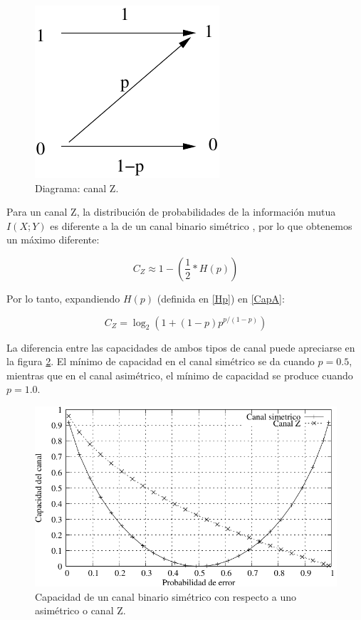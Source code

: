 \begin{figure}[th]
  \begin{center}
    \includegraphics[scale=1]{graphs/zchannel}
  \end{center}
  \caption{Diagrama: canal Z.}
  \label{fig:Gal}
\end{figure}

Para un canal Z, la distribución de probabilidades de la información mutua $I(X;Y)$ es diferente a la de un canal binario simétrico \cite{Tallini:02}, por lo que obtenemos un máximo diferente:

\begin{equation}\label{CapA}
C_{Z} \approx 1 - \left(\frac{1}{2}*H(p)\right)
\end{equation}

Por lo tanto, expandiendo $H(p)$ (definida en \ref{Hp}) en \ref{CapA}:

$$ C_{Z} = \log_2\left(1+(1-p) p^{p/(1-p)}\right) $$

La diferencia entre las capacidades de ambos tipos de canal puede apreciarse en la figura \ref{fig:CompBZ}. El mínimo de capacidad en el canal simétrico se da cuando $p=0.5$, mientras que en el canal asimétrico, el mínimo de capacidad se produce cuando $p=1.0$.

\begin{figure}[th]
  \begin{center}
    \includegraphics[scale=1.1]{graphs/grafico_comparacion_capacidad_binaria_z}
  \end{center}
  \caption{Capacidad de un canal binario simétrico con respecto a uno asimétrico o canal Z.}
  \label{fig:CompBZ}
\end{figure}


